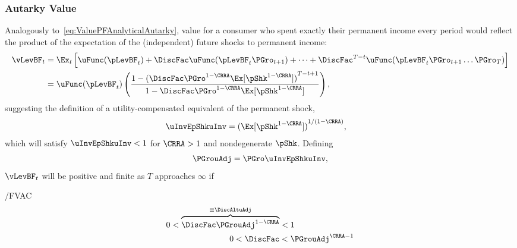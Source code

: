 \documentclass[ProjectDLO]{subfiles}
\begin{document}
\subsubsection{Autarky Value}
Analogously to~\eqref{eq:ValuePFAnalyticalAutarky}, value for a consumer who spent exactly their permanent income every period would reflect the product of the expectation of the (independent) future shocks to permanent income:\hypertarget{uInvEpShkuInv}{}
\begin{align*}
  \vLevBF_{t}  & = \Ex_{t}\left[\uFunc(\pLevBF_{t}) + \DiscFac \uFunc(\pLevBF_{t}\PGro_{t+1}) + \cdots + \DiscFac^{T-t}\uFunc(\pLevBF_{t}\PGro_{t+1}\ldots\PGro_{T})\right] \\
               & = \uFunc(\pLevBF_{t})\left(\frac{1-{(\DiscFac \PGro^{1-\CRRA}\Ex[\pShk^{1-\CRRA}])}^{T-t+1}}{1-\DiscFac \PGro^{1-\CRRA} \Ex[\pShk^{1-\CRRA}]}\right),
\end{align*}
suggesting the definition of a utility-compensated equivalent of the permanent shock,\hypertarget{PermGrouAdj}{}
\begin{align}
  \uInvEpShkuInv  & = {(\Ex[\pShk^{1-\CRRA}])}^{1/(1-\CRRA)} \label{eq:uInvEpShkuInv},
\end{align}
which will satisfy $\uInvEpShkuInv < 1$ for $\CRRA>1$ and nondegenerate $\pShk$.%
\hypertarget{DiscAltuAdj}{} Defining
\begin{equation}
  \label{eq:PGrouAdj}
  \PGrouAdj = \PGro \uInvEpShkuInv,
\end{equation}
$\vLevBF_{t}$ will be positive and finite as $T$ approaches $\infty$ if\hypertarget{FVAC}{}
\begin{verbatimwrite}{\EqDir/FVAC}
  \begin{align}
    0 < \overbrace{\DiscFac \PGrouAdj^{1-\CRRA} }^{\equiv \DiscAltuAdj}  & < 1 \notag
    \\ 0 < \DiscFac  & < \PGrouAdj^{\CRRA-1} \label{eq:FVAC}
  \end{align}
\end{verbatimwrite}
{}
\end{document}
